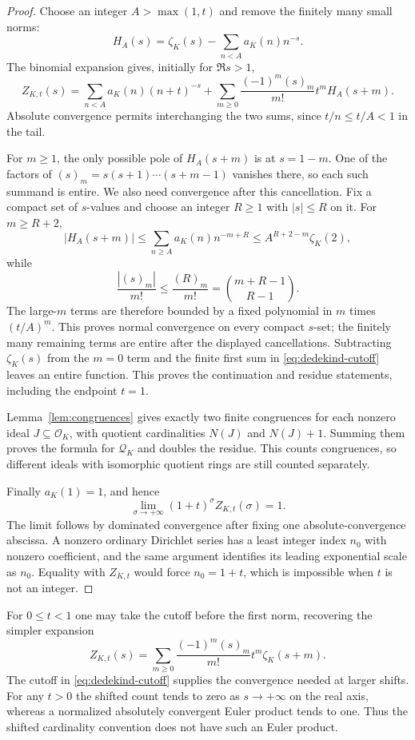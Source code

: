 \begin{proof}
Choose an integer $A>\max(1,t)$ and remove the finitely many small norms:
\[
 H_A(s)=\zeta_K(s)-\sum_{n<A}a_K(n)n^{-s}.
\]
The binomial expansion gives, initially for $\Re s>1$,
\begin{equation}\label{eq:dedekind-cutoff}
 Z_{K,t}(s)=\sum_{n<A}a_K(n)(n+t)^{-s}
 +\sum_{m\ge0}\frac{(-1)^m(s)_m}{m!}t^m H_A(s+m).
\end{equation}
Absolute convergence permits interchanging the two sums, since $t/n\le t/A<1$ in the tail.

For $m\ge1$, the only possible pole of $H_A(s+m)$ is at $s=1-m$. One of the factors of $(s)_m=s(s+1)\cdots(s+m-1)$ vanishes there, so each such summand is entire. We also need convergence after this cancellation. Fix a compact set of $s$-values and choose an integer $R\ge1$ with $|s|\le R$ on it. For $m\ge R+2$,
\[
 |H_A(s+m)|\le\sum_{n\ge A}a_K(n)n^{-m+R}
 \le A^{R+2-m}\zeta_K(2),
\]
while
\[
 \frac{|(s)_m|}{m!}\le\frac{(R)_m}{m!}
 =\binom{m+R-1}{R-1}.
\]
The large-$m$ terms are therefore bounded by a fixed polynomial in $m$ times $(t/A)^m$. This proves normal convergence on every compact $s$-set; the finitely many remaining terms are entire after the displayed cancellations. Subtracting $\zeta_K(s)$ from the $m=0$ term and the finite first sum in \eqref{eq:dedekind-cutoff} leaves an entire function. This proves the continuation and residue statements, including the endpoint $t=1$.

Lemma~\ref{lem:congruences} gives exactly two finite congruences for each nonzero ideal $J\subseteq\mathcal O_K$, with quotient cardinalities $N(J)$ and $N(J)+1$. Summing them proves the formula for $\mathcal Q_K$ and doubles the residue. This counts congruences, so different ideals with isomorphic quotient rings are still counted separately.

Finally $a_K(1)=1$, and hence
\[
 \lim_{\sigma\to+\infty}(1+t)^\sigma Z_{K,t}(\sigma)=1.
\]
The limit follows by dominated convergence after fixing one absolute-convergence abscissa. A nonzero ordinary Dirichlet series has a least integer index $n_0$ with nonzero coefficient, and the same argument identifies its leading exponential scale as $n_0$. Equality with $Z_{K,t}$ would force $n_0=1+t$, which is impossible when $t$ is not an integer.
\end{proof}

For $0\le t<1$ one may take the cutoff before the first norm, recovering the simpler expansion
\[
 Z_{K,t}(s)=\sum_{m\ge0}\frac{(-1)^m(s)_m}{m!}t^m\zeta_K(s+m).
\]
The cutoff in \eqref{eq:dedekind-cutoff} supplies the convergence needed at larger shifts. For any $t>0$ the shifted count tends to zero as $s\to+\infty$ on the real axis, whereas a normalized absolutely convergent Euler product tends to one. Thus the shifted cardinality convention does not have such an Euler product.
